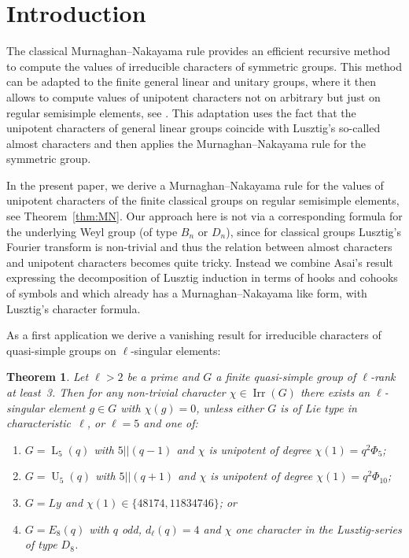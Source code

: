 \documentclass{ert-l}
\newcommand{\Irr}{{\operatorname{Irr}}}
\newcommand{\PSL}{{\operatorname{L}}}
\newcommand{\PSU}{{\operatorname{U}}}
\newtheorem{thmA}{Theorem}
\theoremstyle{definition}
\theoremstyle{remark}
\begin{document}
\section{Introduction}   \label{sec:intro}
The classical Murnaghan--Nakayama rule provides an efficient recursive method
to compute the values of irreducible characters of symmetric groups. This
method can be adapted to the finite general linear and unitary groups, where
it then allows to compute values of unipotent characters not on arbitrary
but just on regular semisimple elements, see \cite[Prop.~3.3]{LM15}. This
adaptation uses the fact that the unipotent characters of general linear groups
coincide with Lusztig's so-called almost characters and then applies the
Murnaghan--Nakayama rule for the symmetric group. \par
In the present paper, we derive a Murnaghan--Nakayama rule for the values of
unipotent characters of the finite classical groups on regular semisimple
elements, see Theorem~\ref{thm:MN}. Our approach here is not via a
corresponding formula for the underlying Weyl group (of type $B_n$ or $D_n$),
since for classical groups Lusztig's Fourier transform is non-trivial and thus
the relation between almost characters and unipotent characters becomes quite
tricky. Instead we combine Asai's result expressing the decomposition of
Lusztig induction in terms of hooks and cohooks of symbols and which already
has a Murnaghan--Nakayama like form, with Lusztig's character formula.
\medskip

As a first application we derive a vanishing result for irreducible characters
of quasi-simple groups on $\ell$-singular elements:

\begin{thmA}   \label{thmA:zeroes}
 Let $\ell>2$ be a prime and $G$ a finite quasi-simple group of $\ell$-rank at
 least~3. Then for any non-trivial character $\chi\in\Irr(G)$ there exists an
 $\ell$-singular element $g\in G$ with $\chi(g)=0$, unless either $G$ is of
 Lie type in characteristic~$\ell$, or $\ell=5$ and one of:
 \begin{enumerate}
  \item[\rm(1)] $G=\PSL_5(q)$ with $5||(q-1)$ and $\chi$ is unipotent
   of degree $\chi(1)=q^2\Phi_5$;
  \item[\rm(2)] $G=\PSU_5(q)$ with $5||(q+1)$ and $\chi$ is unipotent
   of degree $\chi(1)=q^2\Phi_{10}$;
  \item[\rm(3)] $G=Ly$ and $\chi(1)\in\{48174,11834746\}$; or
  \item[\rm(4)] $G=E_8(q)$ with $q$ odd, $d_\ell(q) = 4$ and $\chi$ one 
   character in the Lusztig-series of type $D_8$.
 \end{enumerate}
\end{thmA}
\end{document}
